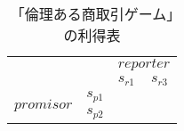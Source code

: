 \begin{table*}
  \centering
  \begin{tabular}{|l|l|l|l|}
    \hline
    \multicolumn{2}{|l|}{\multirow{2}{*}{}} & \multicolumn{2}{l|}{$reporter$} \\ \cline{3-4}
    \multicolumn{2}{|l|}{}                  &$s_{r1}$&$s_{r3}$\\ \hline
    \multirow{2}{*}{$promisor$}
    &$s_{p1}$&\tabularc{\SROS}&\tabularc{\FROS}\\ \cline{2-4}
    &$s_{p2}$&\tabularc{\SROF}&\tabularc{\SROF}\\ \hline
  \end{tabular}
  \caption{「倫理ある商取引ゲーム」の利得表}
  \label{ethical-gametable}
\end{table*}